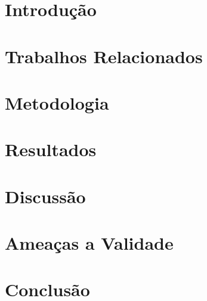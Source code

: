 \documentclass[sigconf]{acmart}
\begin{document}




\maketitle

\section{Introdu\c{c}\~ao}


\section{Trabalhos Relacionados}


\section{Metodologia}


\section{Resultados}


\section{Discuss\~ao}


\section{Amea\c{c}as a Validade}


\section{Conclus\~ao}


% 


 
\end{document}
